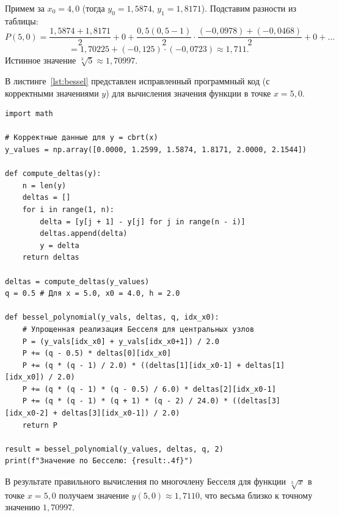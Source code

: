 \documentclass[a4paper, final]{article}
\begin{document}
Примем за $x_0 = 4{,}0$ (тогда $y_0 = 1{,}5874$, $y_1 = 1{,}8171$). Подставим разности из таблицы:
\[
P(5{,}0) = \frac{1{,}5874 + 1{,}8171}{2} + 0 + \frac{0{,}5(0{,}5-1)}{2} \cdot \frac{(-0{,}0978) + (-0{,}0468)}{2} + 0 + \dots 
\]
\[
= 1{,}70225 + (-0{,}125) \cdot (-0{,}0723) \approx 1{,}711.
\]
Истинное значение $\sqrt[3]{5} \approx 1{,}70997$. 

В листинге~\ref{lst:bessel} представлен исправленный программный код (с корректными значениями $y$) для вычисления значения функции в точке \(x = 5{,}0\).

\begin{lstlisting}[caption={Вычисление значения функции с помощью многочлена Бесселя}, label=lst:bessel]
import math

# Корректные данные для y = cbrt(x)
y_values = np.array([0.0000, 1.2599, 1.5874, 1.8171, 2.0000, 2.1544])

def compute_deltas(y):
    n = len(y)
    deltas = []
    for i in range(1, n):
        delta = [y[j + 1] - y[j] for j in range(n - i)]
        deltas.append(delta)
        y = delta
    return deltas

deltas = compute_deltas(y_values)
q = 0.5 # Для x = 5.0, x0 = 4.0, h = 2.0

def bessel_polynomial(y_vals, deltas, q, idx_x0):
    # Упрощенная реализация Бесселя для центральных узлов
    P = (y_vals[idx_x0] + y_vals[idx_x0+1]) / 2.0
    P += (q - 0.5) * deltas[0][idx_x0]
    P += (q * (q - 1) / 2.0) * ((deltas[1][idx_x0-1] + deltas[1][idx_x0]) / 2.0)
    P += (q * (q - 1) * (q - 0.5) / 6.0) * deltas[2][idx_x0-1]
    P += (q * (q - 1) * (q + 1) * (q - 2) / 24.0) * ((deltas[3][idx_x0-2] + deltas[3][idx_x0-1]) / 2.0)
    return P

result = bessel_polynomial(y_values, deltas, q, 2)
print(f"Значение по Бесселю: {result:.4f}")
\end{lstlisting}

В результате правильного вычисления по многочлену Бесселя для функции $\sqrt[3]{x}$ в точке $x = 5{,}0$ получаем значение $y(5{,}0) \approx 1{,}7110$, что весьма близко к точному значению $1{,}70997$.
\end{document}
